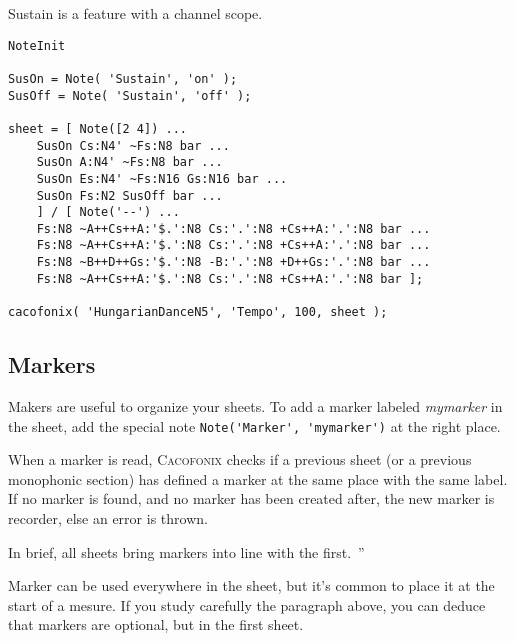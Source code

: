 \documentclass{article}
\newcommand{\cacofonix}{\textsc{Cacofonix}\xspace}
\newenvironment{meenv}{ \par \noindent \makebox[6em][r]{ \textcolor{mecolor}{Me}: `` --~}}{~''}
\newcommand{\me}[1]{\begin{meenv}#1\end{meenv}}
\begin{document}
Sustain is a feature with a channel scope.


\begin{lstlisting}
NoteInit

SusOn = Note( 'Sustain', 'on' );
SusOff = Note( 'Sustain', 'off' );

sheet = [ Note([2 4]) ...
	SusOn Cs:N4' ~Fs:N8 bar ...
	SusOn A:N4' ~Fs:N8 bar ...
	SusOn Es:N4' ~Fs:N16 Gs:N16 bar ...
	SusOn Fs:N2 SusOff bar ...
	] / [ Note('--') ...
	Fs:N8 ~A++Cs++A:'$.':N8 Cs:'.':N8 +Cs++A:'.':N8 bar ...
	Fs:N8 ~A++Cs++A:'$.':N8 Cs:'.':N8 +Cs++A:'.':N8 bar ...
	Fs:N8 ~B++D++Gs:'$.':N8 -B:'.':N8 +D++Gs:'.':N8 bar ...
	Fs:N8 ~A++Cs++A:'$.':N8 Cs:'.':N8 +Cs++A:'.':N8 bar ];

cacofonix( 'HungarianDanceN5', 'Tempo', 100, sheet );
\end{lstlisting}

\subsection{Markers}
\label{sec:Markers}

Makers are useful to organize your sheets. To add a marker labeled \emph{mymarker} in the sheet, add the special note \lstinline!Note('Marker', 'mymarker')! at the right place.

When a marker is read, \cacofonix checks if a previous sheet (or a previous monophonic section) has defined a marker at the same place with the same label. If no marker is found, and no marker has been created after, the new marker is recorder, else an error is thrown.
\me{In brief, all sheets bring markers into line with the first.}

Marker can be used everywhere in the sheet, but it's common to place it at the start of a mesure. If you study carefully the paragraph above, you can deduce that markers are optional, but in the first sheet.
\end{document}

